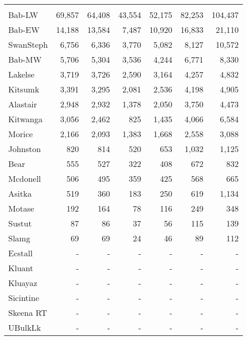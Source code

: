 \documentclass[french,11pt]{book}
\begin{document}
\begin{longtable}[t]{lrrrrrr}
\midrule\\ Bab-LW & 69,857 & 64,408 & 43,554 & 52,175 & 82,253 & 104,437\\ Bab-EW & 14,188 & 13,584 & 7,487 & 10,920 & 16,833 & 21,110\\ SwanSteph & 6,756 & 6,336 & 3,770 & 5,082 & 8,127 & 10,572\\ Bab-MW & 5,706 & 5,304 & 3,536 & 4,244 & 6,771 & 8,330\\ Lakelse & 3,719 & 3,726 & 2,590 & 3,164 & 4,257 & 4,832\\ Kitsumk & 3,391 & 3,295 & 2,081 & 2,536 & 4,198 & 4,905\\ Alastair & 2,948 & 2,932 & 1,378 & 2,050 & 3,750 & 4,473\\ Kitwanga & 3,056 & 2,462 & 825 & 1,435 & 4,066 & 6,584\\ Morice & 2,166 & 2,093 & 1,383 & 1,668 & 2,558 & 3,088\\ Johnston & 820 & 814 & 520 & 653 & 1,032 & 1,125\\ Bear & 555 & 527 & 322 & 408 & 672 & 832\\ Mcdonell & 506 & 495 & 359 & 425 & 568 & 665\\ Asitka & 519 & 360 & 183 & 250 & 619 & 1,134\\ Motase & 192 & 164 & 78 & 116 & 249 & 348\\ Sustut & 87 & 86 & 37 & 56 & 115 & 139\\ Slamg & 69 & 69 & 24 & 46 & 89 & 112\\ Ecstall & - & - & - & - & - & -\\ Kluant & - & - & - & - & - & -\\ Kluayaz & - & - & - & - & - & -\\ Sicintine & - & - & - & - & - & -\\ Skeena RT & - & - & - & - & - & -\\ UBulkLk & - & - & - & - & - & -\\* \end{longtable}

\endgroup{} \endgroup{}

\clearpage
\end{document}
